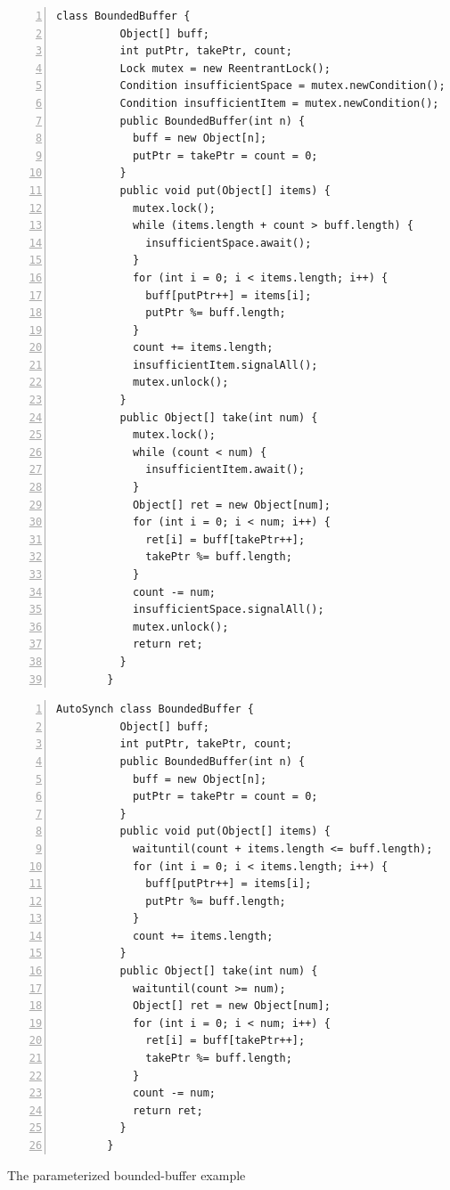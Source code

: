 \documentclass[preprint]{sigplanconf}
\begin{document}
\begin{figure}[ht!]
\begin{multicols}{2}
    \begin{Verbatim}[fontsize=\footnotesize,gobble=8,frame=topline,
            framesep=5mm,numbers=left,numbersep=2pt,
            label=\fbox{\small\emph{Explicit-Signal}}]
        class BoundedBuffer {
          Object[] buff;  
          int putPtr, takePtr, count;
          Lock mutex = new ReentrantLock();
          Condition insufficientSpace = mutex.newCondition();
          Condition insufficientItem = mutex.newCondition();
          public BoundedBuffer(int n) {
            buff = new Object[n];
            putPtr = takePtr = count = 0;
          }
          public void put(Object[] items) {
            mutex.lock();
            while (items.length + count > buff.length) {
              insufficientSpace.await();
            }
            for (int i = 0; i < items.length; i++) {
              buff[putPtr++] = items[i];
              putPtr %= buff.length;
            }
            count += items.length;
            insufficientItem.signalAll();
            mutex.unlock();
          }
          public Object[] take(int num) {
            mutex.lock();
            while (count < num) {
              insufficientItem.await();
            }
            Object[] ret = new Object[num];
            for (int i = 0; i < num; i++) {
              ret[i] = buff[takePtr++];
              takePtr %= buff.length;
            }
            count -= num;
            insufficientSpace.signalAll();
            mutex.unlock();
            return ret;
          }
        }
    \end{Verbatim}
    \begin{Verbatim}[fontsize=\footnotesize,gobble=8,frame=lines,framesep=5mm,
            numbers=left,numbersep=2pt,
            label=\fbox{\small\emph{Automatic-Signal}}]
        AutoSynch class BoundedBuffer { 
          Object[] buff; 
          int putPtr, takePtr, count; 
          public BoundedBuffer(int n) {
            buff = new Object[n];
            putPtr = takePtr = count = 0;
          }
          public void put(Object[] items) { 
            waituntil(count + items.length <= buff.length); 
            for (int i = 0; i < items.length; i++) {
              buff[putPtr++] = items[i];
              putPtr %= buff.length;
            }
            count += items.length; 
          } 
          public Object[] take(int num) { 
            waituntil(count >= num);
            Object[] ret = new Object[num];
            for (int i = 0; i < num; i++) {
              ret[i] = buff[takePtr++]; 
              takePtr %= buff.length; 
            }
            count -= num;
            return ret;
          }
        }
    \end{Verbatim}
\end{multicols}
    \caption{The parameterized bounded-buffer example}
    \label{fig:bb_exp}
\end{figure}
\end{document}
